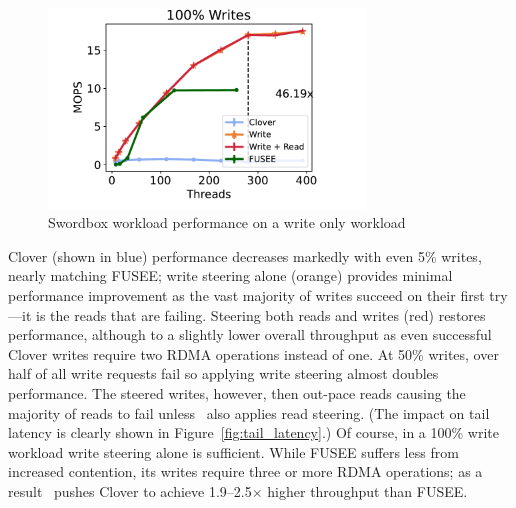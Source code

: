 \begin{figure}
    \center
    \includegraphics[width=0.75\textwidth]{fig/full_system_performance-d.pdf}
    \caption{Swordbox workload performance on a write only workload}
    \label{fig:full_system_performance-w}
\end{figure}


Clover (shown in blue) performance
decreases markedly with even 5\% writes, nearly matching FUSEE; write steering
alone (orange) provides minimal performance improvement as
the vast majority of writes succeed on their first try---it
is the reads that are failing.  Steering both reads and
writes (red) restores performance, although to a slightly
lower overall throughput as even successful Clover writes
require two RDMA operations instead of one.
%
%
At 50\% writes, over half of all write requests fail so
applying write steering almost doubles performance.  The
steered writes, however, then out-pace reads causing the
majority of reads to fail unless \sword\ also applies read
steering.  (The impact on tail latency is clearly shown in
Figure~\ref{fig:tail_latency}.)  Of course, in a 100\% write
workload write steering alone is sufficient.  While FUSEE
suffers less from increased contention, its writes require three
or more RDMA operations; as a result \sword\ pushes Clover to achieve 1.9--2.5$\times$ higher
throughput than FUSEE.


